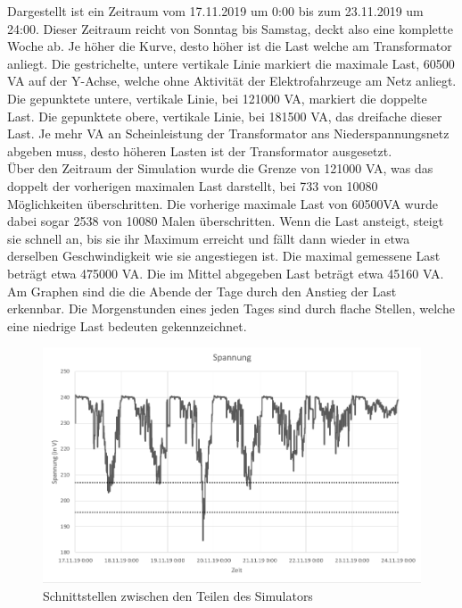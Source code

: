 Dargestellt ist ein Zeitraum vom 17.11.2019 um 0:00 bis zum 23.11.2019 um 24:00. Dieser Zeitraum reicht von Sonntag bis Samstag, deckt also eine komplette Woche ab. Je höher die Kurve, desto höher ist die Last welche am Transformator anliegt. Die gestrichelte, untere vertikale Linie markiert die maximale Last, 60500 VA auf der Y-Achse, welche ohne Aktivität der Elektrofahrzeuge am Netz anliegt. Die gepunktete untere, vertikale Linie, bei 121000 VA, markiert die doppelte Last. Die gepunktete obere, vertikale Linie, bei 181500 VA, das dreifache dieser Last. Je mehr VA an Scheinleistung der Transformator ans Niederspannungsnetz abgeben muss, desto höheren Lasten ist der Transformator ausgesetzt. \\
Über den Zeitraum der Simulation wurde die Grenze von 121000 VA, was das doppelt der vorherigen maximalen Last darstellt, bei 733 von 10080 Möglichkeiten überschritten. Die vorherige maximale Last von 60500VA wurde dabei sogar 2538 von 10080 Malen überschritten. Wenn die Last ansteigt, steigt sie schnell an, bis sie ihr Maximum erreicht und fällt dann wieder in etwa derselben Geschwindigkeit wie sie angestiegen ist. Die maximal gemessene Last beträgt etwa 475000 VA. Die im Mittel abgegeben Last beträgt etwa 45160 VA. Am Graphen sind die die Abende der Tage durch den Anstieg der Last erkennbar. Die Morgenstunden eines jeden Tages sind durch flache Stellen, welche eine niedrige Last bedeuten gekennzeichnet. \\
\begin{figure}[htb]
\centering
	\includegraphics[scale=0.6]{img/VDE_tau/Spannung10m2.png}
	\caption{Schnittstellen zwischen den Teilen des Simulators}
	\label{Abb_VDEtauSpannung10m}
\end{figure}

